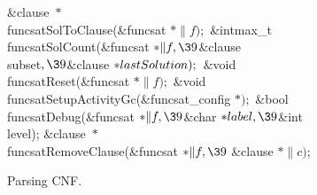 {{{{{\&{clause} ${}{*}{}$\\{funcsatSolToClause}(\&{funcsat} ${}{*}\|f);{}$\6
\&{intmax\_t} \\{funcsatSolCount}(\&{funcsat} ${}{*}\|f,\39{}$\&{clause} %
\\{subset}${},\39{}$\&{clause} ${}{*}\\{lastSolution});{}$\6
\&{void} \\{funcsatReset}(\&{funcsat} ${}{*}\|f);{}$\6
\&{void} \\{funcsatSetupActivityGc}(\&{funcsat\_config} ${}{*});{}$\6
\&{bool} \\{funcsatDebug}(\&{funcsat} ${}{*}\|f,\39{}$\&{char} ${}{*}\\{label},%
\39{}$\&{int} \\{level});\6
\&{clause} ${}{*}{}$\\{funcsatRemoveClause}(\&{funcsat} ${}{*}\|f,\39{}$%
\&{clause} ${}{*}\|c){}$;\par
\fi

Parsing CNF.

}}}}}
